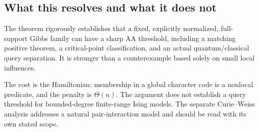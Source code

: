 \subsection{What this resolves and what it does not}\label{qm:what-this-resolves-and-what-it-does-not}

The theorem rigorously establishes that a fixed, explicitly normalized, full-support Gibbs family can have a sharp AA threshold, including a matching positive theorem, a critical-point classification, and an actual quantum/classical query separation. It is stronger than a counterexample based solely on small local influences.

The cost is the Hamiltonian: membership in a global character code is a nonlocal predicate, and the penalty is \(\Theta(n)\). The argument does not establish a query threshold for bounded-degree finite-range Ising models. The separate Curie--Weiss analysis addresses a natural pair-interaction model and should be read with its own stated scope.
